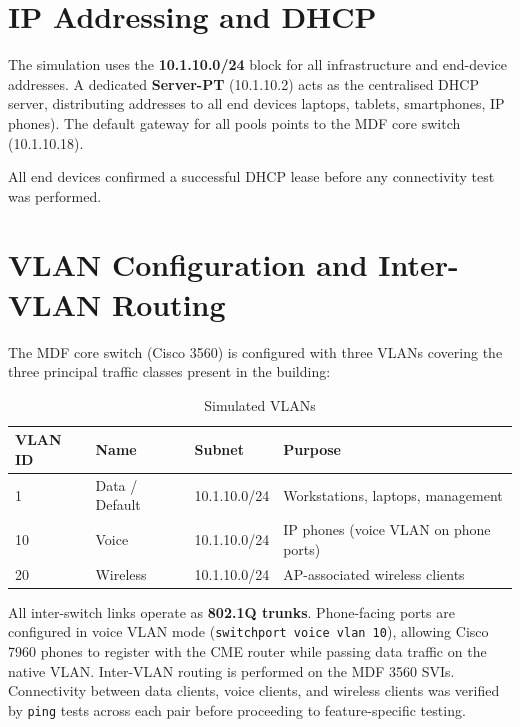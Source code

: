 \documentclass[12pt,a4paper]{report}
\begin{document}
\section{IP Addressing and DHCP}

The simulation uses the \textbf{10.1.10.0/24} block for all
infrastructure and end-device addresses.
A dedicated \textbf{Server-PT} (10.1.10.2) acts as the centralised DHCP
server, distributing addresses to all end devices laptops, tablets,
smartphones, IP phones).
The default gateway for all pools points to the MDF core switch
(10.1.10.18).

All end devices confirmed a successful DHCP lease before any
connectivity test was performed.

\section{VLAN Configuration and Inter-VLAN Routing}

The MDF core switch (Cisco 3560) is configured with three VLANs covering
the three principal traffic classes present in the building:

\begin{table}[H]
  \centering
  \caption{Simulated VLANs}
  \label{tab:pt_vlans}
  \begin{tabular}{C{1.5cm} L{3.5cm} C{3cm} L{3.5cm}}
    \toprule
    \textbf{VLAN ID} & \textbf{Name} & \textbf{Subnet} & \textbf{Purpose} \\
       & Data / Default & 10.1.10.0/24 & Workstations, laptops, management \\
    10  & Voice          & 10.1.10.0/24 & IP phones (voice VLAN on phone ports) \\
    20  & Wireless       & 10.1.10.0/24 & AP-associated wireless clients \\
    \bottomrule
  \end{tabular}
\end{table}

All inter-switch links operate as \textbf{802.1Q trunks}.
Phone-facing ports are configured in voice VLAN mode
(\texttt{switchport voice vlan 10}), allowing Cisco 7960 phones to
register with the CME router while passing data traffic on the native
VLAN.
Inter-VLAN routing is performed on the MDF 3560 SVIs. Connectivity
between data clients, voice clients, and wireless clients was verified
by \texttt{ping} tests across each pair before proceeding to
feature-specific testing.
\end{document}
